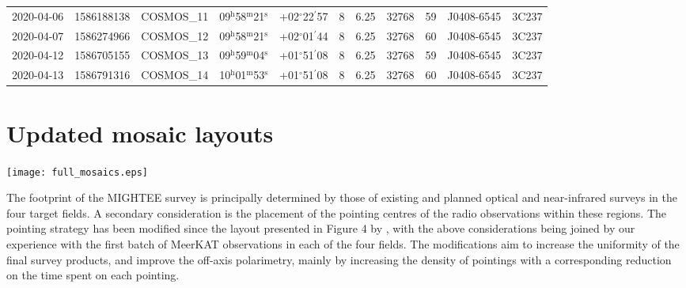 \documentclass[usenatbib,usedcolumn]{mnras}
\newcommand{\hhh}{$^{\mathrm{h}}$}
\newcommand{\mmm}{$^{\mathrm{m}}$}
\newcommand{\sss}{$^{\mathrm{s}}$}
\newcommand{\ddd}{$^{\mathrm{\circ}}$}
\newcommand{\dmm}{$^{\prime}$}
\begin{document}
\begin{table*}
\begin{minipage}{176mm}
\begin{tabular}{lllllllrlll}
2020-04-06&	1586188138&	COSMOS\_11&	09\hhh58\mmm21\sss&	+02\ddd22\dmm57\farcs4&	8	&   6.25&	32768	&59&	J0408-6545&	3C237\\
2020-04-07&	1586274966&	COSMOS\_12&	09\hhh58\mmm21\sss&	+02\ddd01\dmm44\farcs6&	8	&   6.25&	32768	&60&	J0408-6545&	3C237\\
2020-04-12&	1586705155&	COSMOS\_13&	09\hhh59\mmm04\sss&	+01\ddd51\dmm08\farcs2&	8	&   6.25&	32768	&59&	J0408-6545&	3C237\\
2020-04-13&	1586791316&	COSMOS\_14&	10\hhh01\mmm53\sss&	+01\ddd51\dmm08\farcs2&	8	&   6.25&	32768	&60&	J0408-6545&	3C237\\ \hline
\end{tabular}
\label{tab:extra_observations}
\end{minipage}
\end{table*}

\section{Updated mosaic layouts}
\label{sec:mosaics}

\begin{figure*}
\centering
\texttt{[image: full\_mosaics.eps]}
 \caption{The final pointing layouts (and thus eventual sky coverage) for the MIGHTEE observations of E-CDFS, ELAIS-S1 and XMM-LSS. Please refer to Appendix \ref{sec:mosaics} for further details, and Figure \ref{fig:schematic} and Appendix \ref{sec:cosmosappendix} for the COSMOS layout.}
 \label{fig:full_mosaics}
\end{figure*}


The footprint of the MIGHTEE survey is principally determined by those of existing and planned optical and near-infrared surveys in the four target fields. A secondary consideration is the placement of the pointing centres of the radio observations within these regions. The pointing strategy has been modified since the layout presented in Figure 4 by \citet{jarvis2016}, with the above considerations being joined by our experience with the first batch of MeerKAT observations in each of the four fields. The modifications aim to increase the uniformity of the final survey products, and improve the off-axis polarimetry, mainly by increasing the density of pointings with a corresponding reduction on the time spent on each pointing. 
\end{document}
